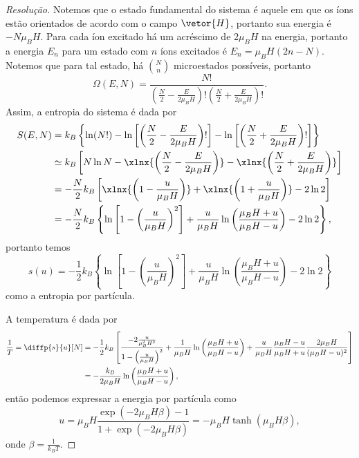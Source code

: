 \begin{proof}[Resolução]
    Notemos que o estado fundamental do sistema é aquele em que os íons estão orientados de acordo com o campo \(\vetor{H}\), portanto sua energia é \(-N\mu_BH\). Para cada íon excitado há um acréscimo de \(2 \mu_B H\) na energia, portanto a energia \(E_n\) para um estado com \(n\) íons excitados é \( E_n = \mu_B H (2n - N).\) Notemos que para tal estado, há \(\binom{N}{n}\) microestados possíveis, portanto
    \begin{equation*}
        \Omega(E, N) = \frac{N!}{\left(\frac{N}{2} - \frac{E}{2\mu_B H}\right)!\left(\frac{N}{2} + \frac{E}{2\mu_B H}\right)!}.
    \end{equation*}
    Assim, a entropia do sistema é dada por
    \begin{align*}
        S(E, N) &= k_B \left\{\ln(N!) - \ln\left[\left(\frac{N}{2} - \frac{E}{2\mu_BH}\right)!\right]- \ln\left[\left(\frac{N}{2} + \frac{E}{2\mu_BH}\right)!\right]\right\}\\
                &\simeq k_B \left[N \ln N - \xlnx{\left(\frac{N}{2} - \frac{E}{2\mu_B H}\right)} - \xlnx{\left(\frac{N}{2} + \frac{E}{2\mu_B H}\right)}\right]\\
                &= -\frac{N}{2}k_B\left[\xlnx{\left(1 - \frac{u}{\mu_BH}\right)} + \xlnx{\left(1 + \frac{u}{\mu_BH}\right)} - 2\ln2\right]\\
                &= - \frac{N}{2} k_B\left\{\ln\left[1 - \left(\frac{u}{\mu_B H}\right)^2\right] + \frac{u}{\mu_B H}\ln\left(\frac{\mu_BH + u}{\mu_BH - u}\right) - 2\ln2\right\},
    \end{align*}
    portanto temos
    \begin{equation*}
        s(u) = -\frac12k_B\left\{\ln\left[1 - \left(\frac{u}{\mu_B H}\right)^2\right] + \frac{u}{\mu_B H}\ln\left(\frac{\mu_BH + u}{\mu_BH - u}\right) - 2\ln2\right\}
    \end{equation*}
    como a entropia por partícula.

    A temperatura é dada por
    \begin{align*}
        \frac{1}{T} = \diffp{s}{u}[N] &= -\frac12 k_B\left[\frac{-2\frac{u}{\mu_B^2 H^2}}{1 - \left(\frac{u}{\mu_BH}\right)^2} + \frac{1}{\mu_B H} \ln\left(\frac{\mu_B H + u}{\mu_B H - u}\right) + \frac{u}{\mu_B H} \frac{\mu_B H - u}{\mu_B H + u} \frac{2\mu_B H}{(\mu_B H - u)^2}\right]\\
                        &= - \frac{k_B}{2\mu_B H}\ln\left(\frac{\mu_B H + u}{\mu_BH - u}\right),
    \end{align*}
    então podemos expressar a energia por partícula como
    \begin{equation*}
        u = \mu_B H\frac{\exp(-2 \mu_B H\beta) - 1}{1 + \exp(-2\mu_BH \beta)} = -\mu_B H \tanh(\mu_B H \beta),
    \end{equation*}
    onde \(\beta = \frac{1}{k_B T}\).


\end{proof}
